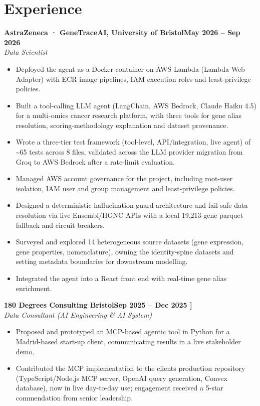 \documentclass[a4paper,11pt]{article}
\newcommand{\entry}[4]{\needspace{4\baselineskip}\noindent\textbf{#1}\hfill\textbf{#2}\\ \textit{#3}\hfill\textit{#4}\par}
\begin{document}
\section{Experience}
\entry{AstraZeneca · GeneTraceAI, University of Bristol}{May 2026 – Sep 2026}{Data Scientist}{}
\begin{itemize}
  \item Deployed the agent as a Docker container on AWS Lambda (Lambda Web Adapter) with ECR image pipelines, IAM execution roles and least-privilege policies.
  \item Built a tool-calling LLM agent (LangChain, AWS Bedrock, Claude Haiku 4.5) for a multi-omics cancer research platform, with three tools for gene alias resolution, scoring-methodology explanation and dataset provenance.
  \item Wrote a three-tier test framework (tool-level, API/integration, live agent) of \textasciitilde{}65 tests across 8 files, validated across the LLM provider migration from Groq to AWS Bedrock after a rate-limit evaluation.
  \item Managed AWS account governance for the project, including root-user isolation, IAM user and group management and least-privilege policies.
  \item Designed a deterministic hallucination-guard architecture and fail-safe data resolution via live Ensembl/HGNC APIs with a local 19,213-gene parquet fallback and circuit breakers.
  \item Surveyed and explored 14 heterogeneous source datasets (gene expression, gene properties, nomenclature), owning the identity-spine datasets and setting metadata boundaries for downstream modelling.
  \item Integrated the agent into a React front end with real-time gene alias enrichment.
\end{itemize}
\vspace{4pt}
\entry{180 Degrees Consulting Bristol}{Sep 2025 – Dec 2025   ]}{Data Consultant (AI Engineering \& AI System)}{}
\begin{itemize}
  \item Proposed and prototyped an MCP-based agentic tool in Python for a Madrid-based start-up client, communicating results in a live stakeholder demo.
  \item Contributed the MCP implementation to the client\textquotesingle{}s production repository (TypeScript/Node.js MCP server, OpenAI query generation, Convex database), now in live day-to-day use; engagement received a 5-star commendation from senior leadership.
\end{itemize}
\end{document}
